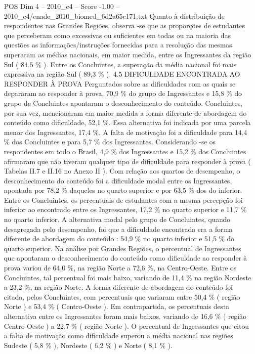 \begin{textsample}{POS Dim 4 – 2010\_c4 – Score -1.00 – 2010\_c4/enade\_2010\_biomed\_6d2a65c171.txt}
Quanto à distribuição de respondentes nas Grandes Regiões, observa -se que as proporções de estudantes que perceberam como excessivas ou suficientes em todas ou na maioria das questões as informações/instruções fornecidas para a resolução das mesmas superaram as médias nacionais, em maior medida, entre os Ingressantes da região Sul ( 84,5 \% ).
Entre os Concluintes, a superação da média nacional foi mais expressiva na região Sul ( 89,3 \% ). 4.5 DIFICULDADE ENCONTRADA AO RESPONDER À PROVA Perguntados sobre as dificuldades com as quais se depararam ao responder à prova, 70,9 \% do grupo de Ingressantes e 15,8 \% do grupo de Concluintes apontaram o desconhecimento do conteúdo.
Concluintes, por sua vez, mencionaram em maior medida a forma diferente de abordagem do conteúdo como dificuldade, 52,1 \%.
Essa alternativa foi indicada por uma parcela menor dos Ingressantes, 17,4 \%.
A falta de motivação foi a dificuldade para 14,4 \% dos Concluintes e para 5,7 \% dos Ingressantes.
Considerando -se os respondentes em todo o Brasil, 4,9 \% dos Ingressantes e 15,2 \% dos Concluintes afirmaram que não tiveram qualquer tipo de dificuldade para responder à prova ( Tabelas II.7 e II.16 no Anexo II ).
Com relação aos quartos de desempenho, o desconhecimento do conteúdo foi a dificuldade modal entre os Ingressantes, apontada por 78,2 \% daqueles no quarto superior e por 63,5 \% dos do inferior.
Entre os Concluintes, os percentuais de estudantes com a mesma percepção foi inferior ao encontrado entre os Ingressantes, 17,2 \% no quarto superior e 11,7 \% no quarto inferior.
A alternativa modal pelo grupo de Concluintes, quando desagregada pelo desempenho, foi que a dificuldade encontrada era a forma diferente de abordagem do conteúdo : 54,9 \% no quarto inferior e 51,5 \% do quarto superior.
Na análise por Grandes Regiões, o percentual de Ingressantes que apontaram o desconhecimento do conteúdo como dificuldade ao responder à prova variou de 64,0 \%, na região Norte a 72,6 \%, na Centro-Oeste.
Entre os Concluintes, tal percentual foi mais baixo, variando de 11,4 \% na região Nordeste a 23,2 \%, na região Norte.
A forma diferente de abordagem do conteúdo foi citada, pelos Concluintes, com percentuais que variaram entre 50,4 \% ( região Norte ) e 53,4 \% ( Centro-Oeste ).
Em contrapartida, os percentuais desta alternativa entre os Ingressantes foram mais baixos, variando de 16,6 \% ( região Centro-Oeste ) a 22,7 \% ( região Norte ).
O percentual de Ingressantes que citou a falta de motivação como dificuldade superou a média nacional nas regiões Sudeste ( 5,8 \% ), Nordeste ( 6,2 \% ) e Norte ( 8,1 \% ).

\end{textsample}
